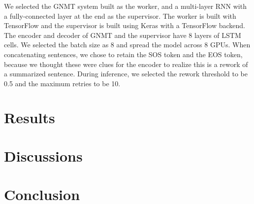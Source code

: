 \documentclass[letterpaper]{article} %
\begin{document}
We selected the GNMT system built as the worker, and a multi-layer RNN with a fully-connected layer at the end as the supervisor. The worker is built with TensorFlow and the supervisor is built using Keras with a TensorFlow backend. The encoder and decoder of GNMT and the supervisor have 8 layers of LSTM cells. We selected the batch size as 8 and spread the model across 8 GPUs. When concatenating sentences, we chose to retain the SOS token and the EOS token, because we thought these were clues for the encoder to realize this is a rework of a summarized sentence. During inference, we selected the rework threshold to be 0.5 and the maximum retries to be 10.

\section{Results}

\section{Discussions}

\section{Conclusion}



\end{document}
